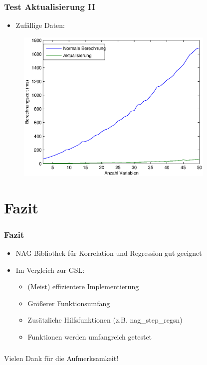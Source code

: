 \documentclass{beamer}
\begin{document}
\begin{frame}
  \frametitle{Test Aktualisierung II}
  
  \begin{itemize}
  \item Zufällige Daten:
  \end{itemize}

  \begin{figure}[t]
    \centering
    \includegraphics[width=9.5cm]{figures/multi_reg_vars_2500_obs_act_rand.eps}
  \end{figure}

\end{frame}


\section{Fazit}
\begin{frame}
  \frametitle{Fazit}
  
  \begin{itemize}
  \item NAG Bibliothek für Korrelation und Regression gut geeignet
  \item Im Vergleich zur GSL:
    \begin{itemize}
    \item (Meist) effizientere Implementierung
    \item Größerer Funktionsumfang
    \item Zusätzliche Hilfsfunktionen (z.B. nag\_step\_regsn)
    \item Funktionen werden umfangreich getestet
    \end{itemize}
  \end{itemize}
  
\end{frame}

\begin{frame}
  \frametitle{}

  \begin{center}
    {\Large Vielen Dank für die Aufmerksamkeit!}
  \end{center}

\end{frame}
\end{document}
